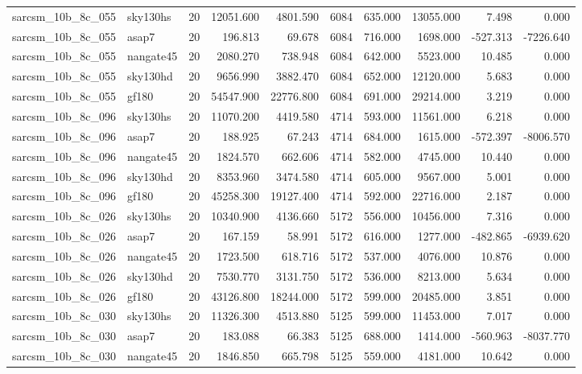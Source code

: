 \documentclass{article}
\begin{document}
\begin{longtable}{llrrrrrrrr}
sarcsm\_10b\_8c\_055 & sky130hs & 20 & 12051.600 & 4801.590 & 6084 & 635.000 & 13055.000 & 7.498 & 0.000 \\
sarcsm\_10b\_8c\_055 & asap7 & 20 & 196.813 & 69.678 & 6084 & 716.000 & 1698.000 & -527.313 & -7226.640 \\
sarcsm\_10b\_8c\_055 & nangate45 & 20 & 2080.270 & 738.948 & 6084 & 642.000 & 5523.000 & 10.485 & 0.000 \\
sarcsm\_10b\_8c\_055 & sky130hd & 20 & 9656.990 & 3882.470 & 6084 & 652.000 & 12120.000 & 5.683 & 0.000 \\
sarcsm\_10b\_8c\_055 & gf180 & 20 & 54547.900 & 22776.800 & 6084 & 691.000 & 29214.000 & 3.219 & 0.000 \\
sarcsm\_10b\_8c\_096 & sky130hs & 20 & 11070.200 & 4419.580 & 4714 & 593.000 & 11561.000 & 6.218 & 0.000 \\
sarcsm\_10b\_8c\_096 & asap7 & 20 & 188.925 & 67.243 & 4714 & 684.000 & 1615.000 & -572.397 & -8006.570 \\
sarcsm\_10b\_8c\_096 & nangate45 & 20 & 1824.570 & 662.606 & 4714 & 582.000 & 4745.000 & 10.440 & 0.000 \\
sarcsm\_10b\_8c\_096 & sky130hd & 20 & 8353.960 & 3474.580 & 4714 & 605.000 & 9567.000 & 5.001 & 0.000 \\
sarcsm\_10b\_8c\_096 & gf180 & 20 & 45258.300 & 19127.400 & 4714 & 592.000 & 22716.000 & 2.187 & 0.000 \\
sarcsm\_10b\_8c\_026 & sky130hs & 20 & 10340.900 & 4136.660 & 5172 & 556.000 & 10456.000 & 7.316 & 0.000 \\
sarcsm\_10b\_8c\_026 & asap7 & 20 & 167.159 & 58.991 & 5172 & 616.000 & 1277.000 & -482.865 & -6939.620 \\
sarcsm\_10b\_8c\_026 & nangate45 & 20 & 1723.500 & 618.716 & 5172 & 537.000 & 4076.000 & 10.876 & 0.000 \\
sarcsm\_10b\_8c\_026 & sky130hd & 20 & 7530.770 & 3131.750 & 5172 & 536.000 & 8213.000 & 5.634 & 0.000 \\
sarcsm\_10b\_8c\_026 & gf180 & 20 & 43126.800 & 18244.000 & 5172 & 599.000 & 20485.000 & 3.851 & 0.000 \\
sarcsm\_10b\_8c\_030 & sky130hs & 20 & 11326.300 & 4513.880 & 5125 & 599.000 & 11453.000 & 7.017 & 0.000 \\
sarcsm\_10b\_8c\_030 & asap7 & 20 & 183.088 & 66.383 & 5125 & 688.000 & 1414.000 & -560.963 & -8037.770 \\
sarcsm\_10b\_8c\_030 & nangate45 & 20 & 1846.850 & 665.798 & 5125 & 559.000 & 4181.000 & 10.642 & 0.000 \\

\end{longtable}
\end{document}
